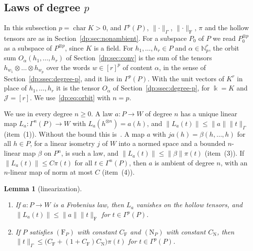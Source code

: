 \documentclass[11pt]{amsart}
\newtheorem{lemma}[theorem]{Lemma}
\theoremstyle{definition}
\theoremstyle{remark}
\numberwithin{equation}{section}
\newcommand{\N}{\mathbb N}
\newcommand{\norm}[1]{\lVert #1\rVert}
\theoremstyle{plain}
\theoremstyle{definition}
\theoremstyle{plain}
\begin{document}
\subsection{Laws of degree \texorpdfstring{$p$}{p}}\label{dp:ac:frobenius}

In this subsection $p=\operatorname{char}K>0$, and $\Gamma^p(P)$, $\norm\cdot_\Gamma$, $\norm\cdot_{\mathrm F}$, $\pi$ and the hollow tensors are as in Section~\ref{dp:sec:nonambient}. For a subspace $P_0$ of $P$ we read $P_0^{\otimes p}$ as a subspace of $P^{\otimes p}$, since $K$ is a field. For $h_1,\dots,h_r\in P$ and $\alpha\in\N^r_p$, the orbit sum $O_\alpha(h_1,\dots,h_r)$ of Section~\ref{dp:sec:conv} is the sum of the tensors $h_{w_1}\otimes\dots\otimes h_{w_p}$ over the words $w\in[r]^p$ of content $\alpha$, in the sense of Section~\ref{dp:ssec:degree-p}, and it lies in $\Gamma^p(P)$. With the unit vectors of $K^r$ in place of $h_1,\dots,h_r$ it is the tensor $O_\alpha$ of Section~\ref{dp:ssec:degree-p}, for $\Bbbk=K$ and $\mathcal J=[r]$. We use~\eqref{dp:eq:orbit} with $n=p$.

We use \cite[Lemma~Q.1]{I} in every degree $n\ge0$. A law $a\colon P\to W$ of degree $n$ has a unique linear map $L_a\colon\Gamma^n(P)\to W$ with $L_a(h^{\otimes n})=a(h)$, and $\norm{L_a(t)}\le\norm a\norm t_\Gamma$ (item~(1)). Without the bound this is~\cite[Th.~IV.1, Prop.~IV.5]{Ro}. A map $a$ with $ja(h)=\beta(h,\dots,h)$ for all $h\in P$, for a linear isometry $j$ of $W$ into a normed space and a bounded $n$\nobreakdash-linear map $\beta$ on $P^n$, is such a law, and $\norm{L_a(t)}\le\norm\beta\pi(t)$ (item~(3)). If $\norm{L_a(t)}\le C\pi(t)$ for all $t\in\Gamma^n(P)$, then $a$ is ambient of degree $n$, with an $n$\nobreakdash-linear map of norm at most $C$ (item~(4)).

\begin{lemma}[linearization]\label{dp:lem:linearization}
\leavevmode
\begin{enumerate}
\item If $a\colon P\to W$ is a Frobenius law, then $L_a$ vanishes on the hollow tensors, and $\norm{L_a(t)}\le\norm a\norm t_{\mathrm F}$ for $t\in\Gamma^p(P)$.
\item If $P$ satisfies $(\mathrm F_P)$ with constant $C_{\mathrm F}$ and $(\mathrm N_P)$ with constant $C_{\mathrm N}$, then $\norm t_\Gamma\le\bigl(C_{\mathrm F}+(1+C_{\mathrm F})C_{\mathrm N}\bigr)\pi(t)$ for $t\in\Gamma^p(P)$.
\end{enumerate}
\end{lemma}
\end{document}
